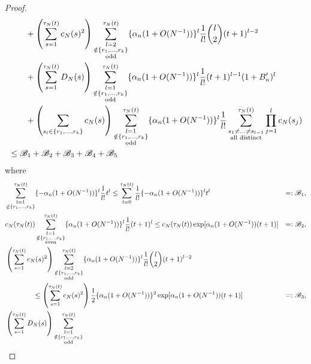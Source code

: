 \documentclass{article}
\newcommand{\1}[1]{\mathbbm{1}_{#1}}
\begin{document}
\begin{proof}
\begin{align}
&\qquad+ \left( \sum_{s=1}^{\tau_N(t)} c_N(s)^2 \right)
\sum_{\substack{l=2 \\ \notin \{r_1,\dots,r_k\} \\ \text{odd} }}^{\tau_N(t)}
\{ \alpha_n (1+O(N^{-1})) \}^l \frac{1}{l!} \binom{l}{2} (t+1)^{l-2} \notag\\
&\qquad+ \left( \sum_{s=1}^{\tau_N(t)} D_N(s) \right)
\sum_{\substack{l=1 \\ \notin \{r_1,\dots,r_k\} \\ \text{odd} }}^{\tau_N(t)}
\{ \alpha_n (1+O(N^{-1})) \}^l \frac{1}{l!} (t+1)^{l-1} (1 + B_n^\prime)^l \notag\\
&\qquad+ \left( \sum_{s_l \in \{r_1, \dots, r_k\} } c_N(s) \right)
\sum_{\substack{l=1 \\ \notin \{r_1,\dots,r_k\} \\ \text{odd} }}^{\tau_N(t)}
\{ \alpha_n (1+O(N^{-1})) \}^l \frac{1}{l!}
\sum_{\substack{s_1\neq \dots \neq s_{l-1} \\ \text{all distinct} }}^{\tau_N(t)}
\prod_{j=1}^l c_N(s_j) \notag\\
&\leq \mathscr{B}_1 + \mathscr{B}_2 + \mathscr{B}_3 + \mathscr{B}_4 + \mathscr{B}_5
\end{align}
where
\begin{align}
&\sum_{\substack{l=1 \\ \notin \{r_1,\dots,r_k\} }}^{\tau_N(t)} 
\{ - \alpha_n (1+O(N^{-1})) \}^l \frac{1}{l!} t^l
\leq \sum_{l=0}^{\tau_N(t)} \frac{1}{l!} \{ - \alpha_n (1+O(N^{-1})) \}^l t^l
&=: \mathscr{B}_1, \notag\\
&c_N(\tau_N(t)) \sum_{\substack{l=1 \\ \notin \{r_1,\dots,r_k\} \\ \text{even} }}^{\tau_N(t)} \{ \alpha_n (1+O(N^{-1})) \}^l \frac{1}{l!} (t+1)^l
\leq c_N(\tau_N(t)) \exp[ \alpha_n (1+O(N^{-1})) (t+1) ]
&=: \mathscr{B}_2, \notag\\
&\left( \sum_{s=1}^{\tau_N(t)} c_N(s)^2 \right)
\sum_{\substack{l=2 \\ \notin \{r_1,\dots,r_k\} \\ \text{odd} }}^{\tau_N(t)}
\{ \alpha_n (1+O(N^{-1})) \}^l \frac{1}{l!} \binom{l}{2} (t+1)^{l-2} \notag\\
&\qquad\qquad \leq \left( \sum_{s=1}^{\tau_N(t)} c_N(s)^2 \right)
\frac{1}{2} \{ \alpha_n (1+O(N^{-1})) \}^2 \exp[ \alpha_n (1+O(N^{-1})) (t+1) ]
&=: \mathscr{B}_3, \notag\\
& \left( \sum_{s=1}^{\tau_N(t)} D_N(s) \right)
\sum_{\substack{l=1 \\ \notin \{r_1,\dots,r_k\} \\ \text{odd} }}^{\tau_N(t)}

\end{align}
\end{proof}
\end{document}
